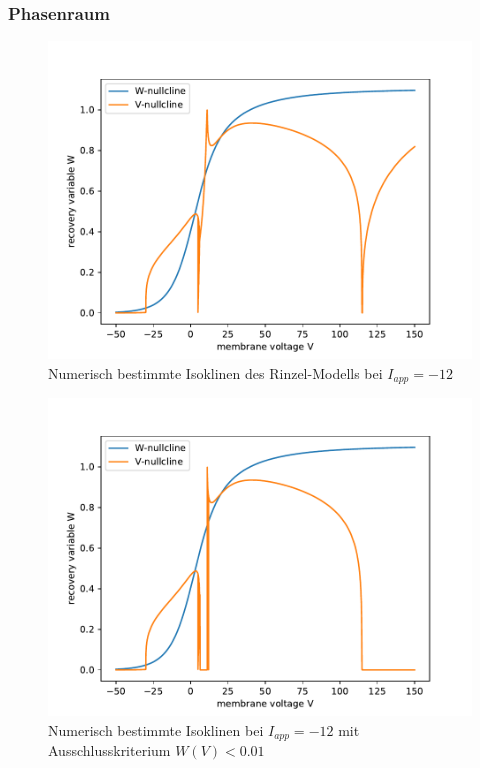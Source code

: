 \documentclass[12pt,a4paper]{article}
\begin{document}
\subsubsection{Phasenraum}
\begin{figure}[H]
	\centering
	\includegraphics[scale=1]{rinzelclines.pdf}\caption{Numerisch bestimmte Isoklinen des Rinzel-Modells bei $I_{app}=-12$}
	\label{rinzelclines}
\end{figure}
\begin{figure}[H]
	\centering
	\includegraphics[scale=1]{rinzelclinescor.pdf}\caption{Numerisch bestimmte Isoklinen bei $I_{app}=-12$ mit Ausschlusskriterium $W(V)<0.01$}
	\label{rinzelclinescor}
\end{figure}
\end{document}
